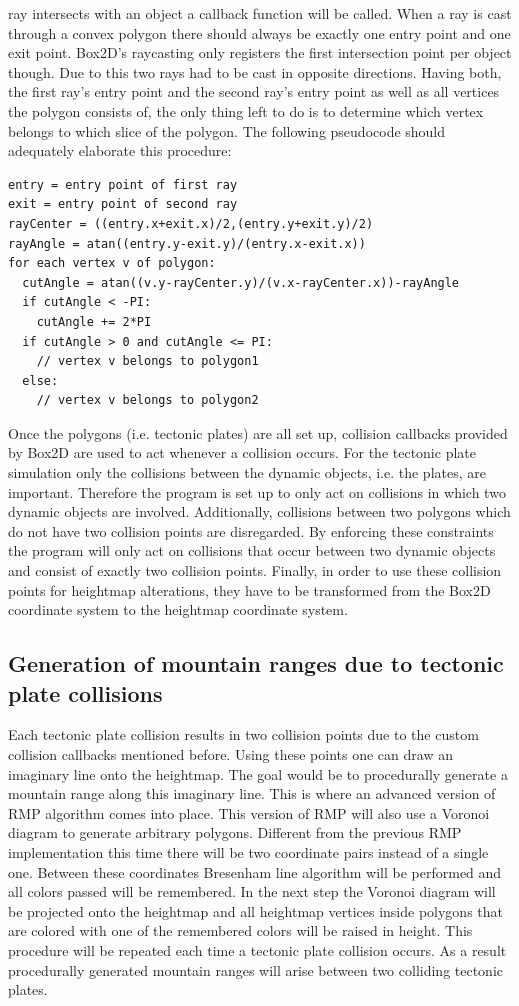 \documentclass[11pt,a4paper,twoside,openright]{report}
\begin{document}
ray intersects with an object a callback function will be called. When a ray is cast through a convex polygon there should always be exactly one entry point and one exit point. Box2D's raycasting only registers the first intersection point per object though. Due to this two rays had to be cast in opposite directions. Having both, the first ray's entry point and the second ray's entry point as well as all vertices the polygon consists of, the only thing left to do is to determine which vertex belongs to which slice of the polygon. The following pseudocode should adequately elaborate this procedure:
\begin{lstlisting}[caption=Point in slice check pseudocode]
entry = entry point of first ray
exit = entry point of second ray
rayCenter = ((entry.x+exit.x)/2,(entry.y+exit.y)/2)
rayAngle = atan((entry.y-exit.y)/(entry.x-exit.x))
for each vertex v of polygon:
  cutAngle = atan((v.y-rayCenter.y)/(v.x-rayCenter.x))-rayAngle
  if cutAngle < -PI:
    cutAngle += 2*PI
  if cutAngle > 0 and cutAngle <= PI:
    // vertex v belongs to polygon1
  else:
    // vertex v belongs to polygon2
\end{lstlisting}
Once the polygons (i.e. tectonic plates) are all set up, collision callbacks provided by Box2D are used to act whenever a collision occurs. For the tectonic plate simulation only the collisions between the dynamic objects, i.e. the plates, are important. Therefore the program is set up to only act on collisions in which two dynamic objects are involved. Additionally, collisions between two polygons which do not have two collision points are disregarded. By enforcing these constraints the program will only act on collisions that occur between two dynamic objects and consist of exactly two collision points. Finally, in order to use these collision points for heightmap alterations, they have to be transformed from the Box2D coordinate system to the heightmap coordinate system.

\subsection{Generation of mountain ranges due to tectonic plate collisions}
\label{subsec:generationofmountainranges}
Each tectonic plate collision results in two collision points due to the custom collision callbacks mentioned before. Using these points one can draw an imaginary line onto the heightmap. The goal would be to procedurally generate a mountain range along this imaginary line. This is where an advanced version of RMP algorithm comes into place. This version of RMP will also use a Voronoi diagram to generate arbitrary polygons. Different from the previous RMP implementation this time there will be two coordinate pairs instead of a single one. Between these coordinates Bresenham line algorithm will be performed and all colors passed will be remembered. In the next step the Voronoi diagram will be projected onto the heightmap and all heightmap vertices inside polygons that are colored with one of the remembered colors will be raised in height. This procedure will be repeated each time a tectonic plate collision occurs. As a result procedurally generated mountain ranges will arise between two colliding tectonic plates.
\end{document}
